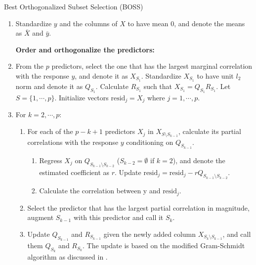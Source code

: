 \begin{algorithm}
\footnotesize
	\caption{Best Orthogonalized Subset Selection (BOSS)}\label{alg:boss}
	\begin{enumerate}[label=\arabic*.]
		\item Standardize $y$ and the columns of $X$ to have mean $0$, and denote the means as $\bar{X}$ and $\bar{y}$.

		\textbf{Order and orthogonalize the predictors:}

		\item From the $p$ predictors, select the one that has the largest marginal correlation with the response $y$,  and denote it as $X_{S_1}$. Standardize $X_{S_1}$ to have unit $l_2$ norm and denote it as $Q_{S_1}$. Calculate $R_{S_1}$ such that $X_{S_1} = Q_{S_1} R_{S_1}$. Let $S=\{1,\cdots, p\}$. Initialize vectors $\text{resid}_j=X_j$ where $j=1,\cdots,p$.
		\item For $k=2,\cdots,p$:
		\begin{enumerate}[label=\alph*.]
			\item For each of the $p-k+1$ predictors $X_j$ in $X_{S \setminus S_{k-1} }$, calculate its partial correlations with the response $y$ conditioning on $Q_{S_{k-1}}$. 

			\begin{enumerate}[label=a\arabic*.]
				\item Regress $X_j$ on $Q_{S_{k-1} \setminus S_{k-2}}$ ($S_{k-2}=\emptyset$ if $k=2$), and denote the estimated coefficient as $r$. Update $\text{resid}_j = \text{resid}_j - r Q_{S_{k-1} \setminus S_{k-2}}$.
				\item Calculate the correlation between y and $\text{resid}_j$.
			\end{enumerate}
			\item Select the predictor that has the largest partial correlation in magnitude, augment $S_{k-1}$ with this predictor and call it $S_{k}$.
			\item Update $Q_{S_{k-1}}$ and $R_{S_{k-1}}$ given the newly added column $X_{S_k \setminus S_{k-1}}$, and call them $Q_{S_k}$ and $R_{S_k}$. The update is based on the modified Gram-Schmidt algorithm as discussed in \citet{hammarling2008updating}.
		\end{enumerate}
		

\end{enumerate}
\end{algorithm}
